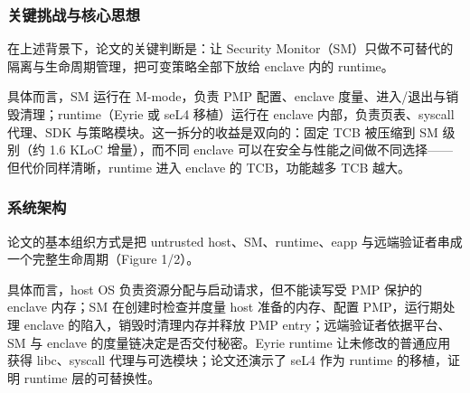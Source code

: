 \documentclass[11pt]{ctexart}
\begin{document}
\subsubsection{关键挑战与核心思想}
在上述背景下，论文的关键判断是：让 Security Monitor（SM）只做不可替代的隔离与生命周期管理，把可变策略全部下放给 enclave 内的 runtime。\par
具体而言，SM 运行在 M-mode，负责 PMP 配置、enclave 度量、进入/退出与销毁清理；runtime（Eyrie 或 seL4 移植）运行在 enclave 内部，负责页表、syscall 代理、SDK 与策略模块。这一拆分的收益是双向的：固定 TCB 被压缩到 SM 级别（约 1.6 KLoC 增量），而不同 enclave 可以在安全与性能之间做不同选择——但代价同样清晰，runtime 进入 enclave 的 TCB，功能越多 TCB 越大。\par
\subsubsection{系统架构}
论文的基本组织方式是把 untrusted host、SM、runtime、eapp 与远端验证者串成一个完整生命周期（Figure 1/2）。\par
具体而言，host OS 负责资源分配与启动请求，但不能读写受 PMP 保护的 enclave 内存；SM 在创建时检查并度量 host 准备的内存、配置 PMP，运行期处理 enclave 的陷入，销毁时清理内存并释放 PMP entry；远端验证者依据平台、SM 与 enclave 的度量链决定是否交付秘密。Eyrie runtime 让未修改的普通应用获得 libc、syscall 代理与可选模块；论文还演示了 seL4 作为 runtime 的移植，证明 runtime 层的可替换性。\par
\end{document}
